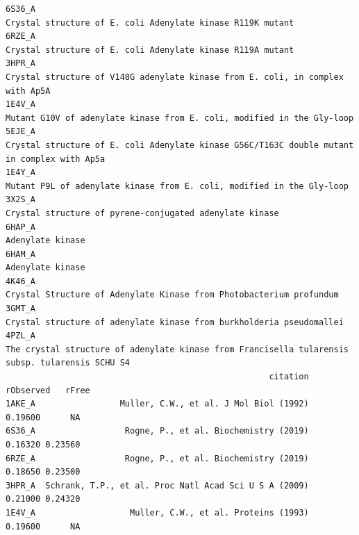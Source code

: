 \documentclass[
  letterpaper,
  DIV=11,
  numbers=noendperiod]{scrartcl}
\begin{document}
\begin{verbatim}
6S36_A                                                                                                                   Crystal structure of E. coli Adenylate kinase R119K mutant
6RZE_A                                                                                                                   Crystal structure of E. coli Adenylate kinase R119A mutant
3HPR_A                                                                                               Crystal structure of V148G adenylate kinase from E. coli, in complex with Ap5A
1E4V_A                                                                                                       Mutant G10V of adenylate kinase from E. coli, modified in the Gly-loop
5EJE_A                                                                                  Crystal structure of E. coli Adenylate kinase G56C/T163C double mutant in complex with Ap5a
1E4Y_A                                                                                                        Mutant P9L of adenylate kinase from E. coli, modified in the Gly-loop
3X2S_A                                                                                                                      Crystal structure of pyrene-conjugated adenylate kinase
6HAP_A                                                                                                                                                             Adenylate kinase
6HAM_A                                                                                                                                                             Adenylate kinase
4K46_A                                                                                                          Crystal Structure of Adenylate Kinase from Photobacterium profundum
3GMT_A                                                                                                         Crystal structure of adenylate kinase from burkholderia pseudomallei
4PZL_A                                                                              The crystal structure of adenylate kinase from Francisella tularensis subsp. tularensis SCHU S4
                                                     citation rObserved   rFree
1AKE_A                 Muller, C.W., et al. J Mol Biol (1992)   0.19600      NA
6S36_A                  Rogne, P., et al. Biochemistry (2019)   0.16320 0.23560
6RZE_A                  Rogne, P., et al. Biochemistry (2019)   0.18650 0.23500
3HPR_A  Schrank, T.P., et al. Proc Natl Acad Sci U S A (2009)   0.21000 0.24320
1E4V_A                   Muller, C.W., et al. Proteins (1993)   0.19600      NA

\end{verbatim}
\end{document}
